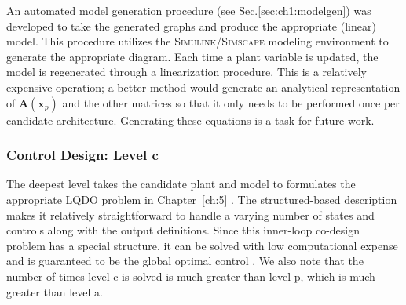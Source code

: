 An automated model generation procedure (see Sec.\ref{sec:ch1:modelgen}) was developed to take the generated graphs and produce the appropriate (linear) model.
This procedure utilizes the \textsc{Simulink}/\textsc{Simscape} modeling environment to generate the appropriate diagram.
Each time a plant variable is updated, the model is regenerated through a linearization procedure.
This is a relatively expensive operation; a better method would generate an analytical representation of $\bm{A}(\bm{x}_p)$ and the other matrices so that it only needs to be performed once per candidate architecture.
Generating these equations is a task for future work.

\subsubsection{Control Design: Level c}

The deepest level takes the candidate plant and model to formulates the appropriate LQDO problem in Chapter~\ref{ch:5} \cite{manuscript-dt-qp}.
The structured-based description makes it relatively straightforward to handle a varying number of states and controls along with the output definitions.
Since this inner-loop co-design problem has a special structure, it can be solved with low computational expense and is guaranteed to be the global optimal control \cite{Herber2017b}.
We also note that the number of times level c is solved is much greater than level p, which is much greater than level a.